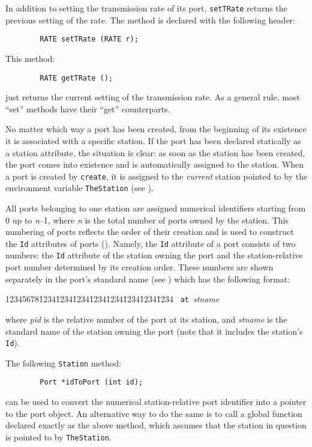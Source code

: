In addition to setting the transmission rate of its port, {\tt setTRate}
returns the previous setting of the rate.
The method is declared with the following header:
\begin{verbatim}
        RATE setTRate (RATE r);
\end{verbatim}
\noindent
This method:
\begin{verbatim}
        RATE getTRate ();
\end{verbatim}
\noindent
just returns the current setting of the transmission rate.
As a general rule, most ``set'' methods have their ``get'' counterparts.

\medskip

No matter which way a port has been created,
from the beginning of its existence it is associated with a specific station.
If the port has been declared statically
as a station attribute, the situation is clear:
as soon as the station has been created, the port comes into existence and
is automatically assigned to the station.
When a port is created by {\tt create}, it is assigned to
the {\em current\/} station pointed to by the environment
variable {\tt TheStation} (see ).

All ports belonging to one station are assigned numerical identifiers starting
from 0 up to {\em n\/}--1, where {\em n\/} is the total number of ports owned by the
station.
This numbering of ports reflects the order of their
creation and is used to construct the
{\tt Id} attributes of ports ().
Namely, the {\tt Id} attribute of a port consists of two numbers: the {\tt Id}
attribute of the station owning the port and the station-relative port
number determined by its creation order.
These numbers are shown separately in the port's standard name
(see ) which has the following format:
{\tt\begin{tabbing}
12345678\=1234\=1234\=1234\=1234\=1234\=1234\=1234\=1234\kill
{}~{\tt at}~{\em stname}
\end{tabbing}}
\noindent
where {\em pid\/} is the relative number of the port at its station, and
{\em stname\/} is the standard name of the station owning the port (note that
it includes the station's {\tt Id}).

The following {\tt Station} method:
\begin{verbatim}
        Port *idToPort (int id);
\end{verbatim}
can be used to convert the numerical station-relative port identifier into
a pointer to the port object.
An alternative way to do the same is to call a global function declared
exactly as the above method, which assumes that the station in question is
pointed to by {\tt TheStation}.


